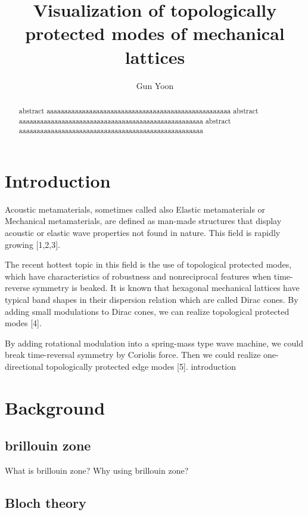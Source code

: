 \documentclass[a4paper]{article}
\title{Visualization of topologically protected modes of mechanical lattices}
\author{Gun Yoon}
\begin{document}
\maketitle
\begin{abstract}
    abstract aaaaaaaaaaaaaaaaaaaaaaaaaaaaaaaaaaaaaaaaaaaaaaaaaaaa
    abstract aaaaaaaaaaaaaaaaaaaaaaaaaaaaaaaaaaaaaaaaaaaaaaaaaaaa
    abstract aaaaaaaaaaaaaaaaaaaaaaaaaaaaaaaaaaaaaaaaaaaaaaaaaaaa
\end{abstract}


\begin{multicols*}{2}

    \section{Introduction}
    Acoustic metamaterials, sometimes called also Elastic metamaterials or Mechanical
    metamaterials, are defined as man-made structures that display acoustic or elastic wave properties not found in nature. This field
    is rapidly growing [1,2,3].

    The recent hottest topic in this field is the use of topological protected modes, which have characteristics of
    robustness and nonreciprocal features when time-reverse symmetry is beaked. It is known that hexagonal
    mechanical lattices have typical band shapes in their dispersion relation which are called Dirac cones. By
    adding small modulations to Dirac cones, we can realize topological protected modes [4].

    By adding rotational modulation into a spring-mass type wave machine, we could break time-reversal
    symmetry by Coriolis force. Then we could realize one-directional topologically protected edge modes [5].
    introduction

    \section{Background}

    \subsection{brillouin zone}

    What is brillouin zone?
    Why using brillouin zone?

    \subsection{Bloch theory}


\end{multicols*}
\end{document}
